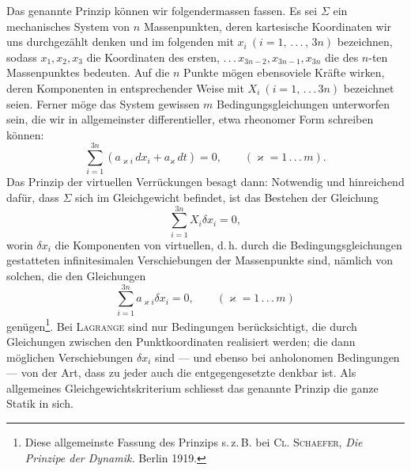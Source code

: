 Das genannte Prinzip können wir folgendermassen fassen. Es sei $\Sigma$ ein
mechanisches System von $n$ Massenpunkten, deren kartesische Koordinaten
wir uns durchgezählt denken und im folgenden mit $x_i\ (i=1,\, .\, .\, .\, ,\,3n)$ bezeichnen,
sodass $x_1,x_2,x_3$ die Koordinaten des ersten, $ .\, .\, .\, x_{3n-2},x_{3n-1},x_{3n}$
die des $n$-ten Massenpunktes bedeuten. Auf die $n$ Punkte mögen ebensoviele
Kräfte wirken, deren Komponenten in entsprechender Weise mit $X_i\ (i=1,\, .\, .\, .\, 3n)$
bezeichnet seien. Ferner möge das System gewissen $m$ Bedingungsgleichungen
unterworfen sein, die wir in allgemeinster differentieller, etwa rheonomer
Form schreiben können:
\[
\sum_{i=1}^{3n}(a_{\varkappa i}\,dx_i+a_{\varkappa}\,dt)=0,
\qquad(\varkappa=1\, .\, .\, .\, m).\tag{1}
\]
\noindent Das Prinzip der virtuellen Verrückungen besagt dann: Notwendig und hinreichend
dafür, dass $\Sigma$ sich im Gleichgewicht befindet, ist das Bestehen der
\clearpage{}
\noindent Gleichung
\[
\sum_{i=1}^{3n}X_i\delta x_i=0,\tag{2}
\]
\noindent worin $\delta x_i$ die Komponenten von virtuellen, d.\,h. durch die Bedingungsgleichungen
gestatteten infinitesimalen Verschiebungen der Massenpunkte sind,
nämlich von solchen, die den Gleichungen
\[
\sum_{i=1}^{3n}a_{\varkappa i}\delta x_i=0,
\qquad(\varkappa=1\, .\, .\, .\, m)\tag{3}
\]
\noindent genügen\footnote{Diese allgemeinste Fassung des Prinzips s.\,z.\,B. bei \textsc{Cl. Schaefer}, \textit{Die Prinzipe der Dynamik.}
Berlin 1919.}. Bei \textsc{Lagrange} sind nur Bedingungen berücksichtigt, die durch
Gleichungen zwischen den Punktkoordinaten realisiert werden; die dann möglichen
Verschiebungen $\delta x_i$ sind — und ebenso bei anholonomen Bedingungen
— von der Art, dass zu jeder auch die entgegengesetzte denkbar ist. Als
allgemeines Gleichgewichtskriterium schliesst das genannte Prinzip die ganze
Statik in sich.

